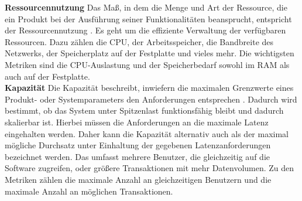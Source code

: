 \noindent
\textbf{Ressourcennutzung}\newline
Das Maß, in dem die Menge und Art der Ressource, die ein Produkt bei der Ausführung seiner Funktionalitäten beansprucht, entspricht der Ressourcennutzung \cite{ISOIEC.}. Es geht um die effiziente Verwaltung der verfügbaren Ressourcen. Dazu zählen die CPU, der Arbeitsspeicher, die Bandbreite des Netzwerks, der Speicherplatz auf der Festplatte und vieles mehr. Die wichtigsten Metriken sind die CPU-Auslastung und der Speicherbedarf sowohl im RAM als auch auf der Festplatte.\cite{Barbacci.1995}\\

\noindent
\textbf{Kapazität}\newline
Die Kapazität beschreibt, inwiefern die maximalen Grenzwerte eines Produkt- oder Systemparameters den Anforderungen entsprechen \cite{ISOIEC.}. Dadurch wird bestimmt, ob das System unter Spitzenlast funktionsfähig bleibt und dadurch skalierbar ist. Hierbei müssen die Anforderungen an die maximale Latenz eingehalten werden. Daher kann die Kapazität alternativ auch als der maximal mögliche Durchsatz unter Einhaltung der gegebenen Latenzanforderungen bezeichnet werden. Das umfasst mehrere Benutzer, die gleichzeitig auf die Software zugreifen, oder größere Transaktionen mit mehr Datenvolumen. Zu den Metriken zählen die maximale Anzahl an gleichzeitigen Benutzern und die maximale Anzahl an möglichen Transaktionen.\cite{Barbacci.1995}